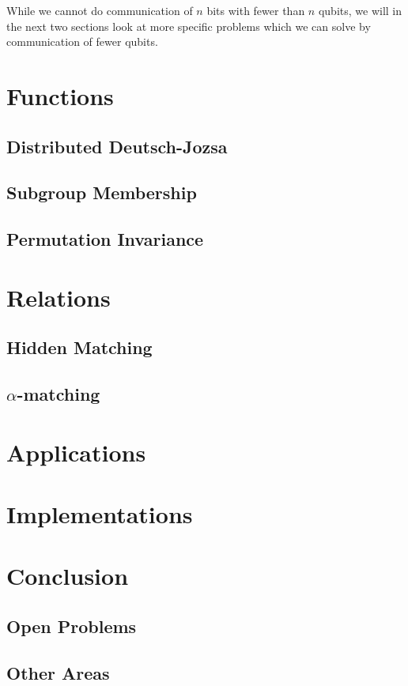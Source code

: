 \documentclass[a4paper]{article}
\begin{document}
    While we cannot do communication of $n$ bits with fewer than $n$ qubits, we will in the next two sections look at more specific problems which we can solve by communication of fewer qubits.

    \section{Functions}

        \subsection{Distributed Deutsch-Jozsa}

        \subsection{Subgroup Membership}

        \subsection{Permutation Invariance}

    \section{Relations}

        \subsection{Hidden Matching}

        \subsection{$\alpha$-matching}

    \section{Applications}

    \section{Implementations}

    \section{Conclusion}

        \subsection{Open Problems}

        \subsection{Other Areas}

    
    {}
\end{document}

